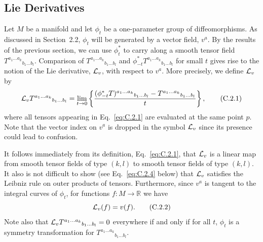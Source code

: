 
\subsection{Lie Derivatives}\label{sec:C.2}

Let \(M\) be a manifold and let \(\phi_t\) be a one-parameter group of
diffeomorphisms. As discussed in Section~2.2, \(\phi_t\) will be generated by a
vector field, \(v^a\). By the results of the previous section, we can use
\(\phi_t^*\) to carry along a smooth tensor field
\(T^{a_1\ldots a_k}{}_{b_1\ldots b_l}\). Comparison of
\(T^{a_1\ldots a_k}{}_{b_1\ldots b_l}\) and
\(\phi_{-t}^*T^{a_1\ldots a_k}{}_{b_1\ldots b_l}\) for small \(t\) gives rise to
the notion of the Lie derivative, \(\mathcal{L}_v\), with respect to \(v^a\). More
precisely, we define \(\mathcal{L}_v\) by
\begin{equation}
  \mathcal{L}_vT^{a_1\ldots a_k}{}_{b_1\ldots b_l}
  =\lim_{t\to0}\left\{
    \frac{(\phi_{-t}^*T)^{a_1\ldots a_k}{}_{b_1\ldots b_l}
    -T^{a_1\ldots a_k}{}_{b_1\ldots b_l}}{t}
  \right\},
  \tag{C.2.1}\label{eq:C.2.1}
\end{equation}
where all tensors appearing in Eq.~\eqref{eq:C.2.1} are evaluated at the same point
\(p\). Note that the vector index on \(v^a\) is dropped in the symbol \(\mathcal{L}_v\)
since its presence could lead to confusion.

It follows immediately from its definition, Eq.~\eqref{eq:C.2.1}, that \(\mathcal{L}_v\)
is a linear map from smooth tensor fields of type \((k,l)\) to smooth tensor fields of
type \((k,l)\). It also is not difficult to show (see Eq.~\eqref{eq:C.2.4} below)
that \(\mathcal{L}_v\) satisfies the Leibniz rule on outer products of tensors. Furthermore,
since \(v^a\) is tangent to the integral curves of \(\phi_t\), for functions
\(f:M\to\mathbb R\) we have
\begin{equation}
  \mathcal{L}_v(f)=v(f).
  \tag{C.2.2}\label{eq:C.2.2}
\end{equation}
Note also that
\(\mathcal{L}_vT^{a_1\ldots a_k}{}_{b_1\ldots b_l}=0\) everywhere if and only if for all
\(t\), \(\phi_t\) is a symmetry transformation for
\(T^{a_1\ldots a_k}{}_{b_1\ldots b_l}\).

